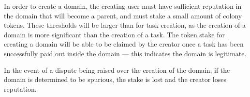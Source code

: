 In order to create a domain, the creating user must have sufficient reputation in the domain that will become a parent, and must stake a small amount of colony tokens. These thresholds will be larger than for task creation, as the creation of a domain is more significant than the creation of a task. The token stake for creating a domain will be able to be claimed by the creator once a task has been successfully paid out inside the domain --- this indicates the domain is legitimate.

In the event of a dispute being raised over the creation of the domain, if the domain is determined to be spurious, the stake is lost and the creator loses reputation.